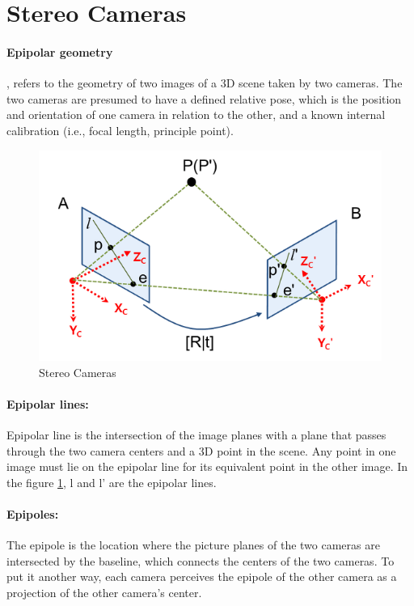 \documentclass[11pt]{article}
\begin{document}
    \section{Stereo Cameras}
    \label{stereo_cameras}
    \paragraph{Epipolar geometry}, refers to the geometry of two images of a 3D scene taken
    by two cameras. The two cameras are presumed to have a defined relative pose, which is
    the position and orientation of one camera in relation to the other, and a known internal calibration
    (i.e., focal length, principle point).

    \begin{figure}
        \centering
        \includegraphics[width=\textwidth,height=\textheight,keepaspectratio]{images/epipolar_1.png}
        \caption{Stereo Cameras}
        \label{fig:stereo_cameras}
    \end{figure}


    \paragraph{Epipolar lines:} Epipolar line is the intersection of the image planes with a plane that
    passes through the two camera centers and a 3D point in the scene. Any point in one image must lie on
    the epipolar line for its equivalent point in the other image. In the figure \ref{fig:stereo_cameras}, l and l' are the epipolar lines.

    \paragraph{Epipoles:} The epipole is the location where the picture planes of the two cameras are
    intersected by the baseline, which connects the centers of the two cameras. To put it another way,
    each camera perceives the epipole of the other camera as a projection of the other camera's center.
    
\end{document}
